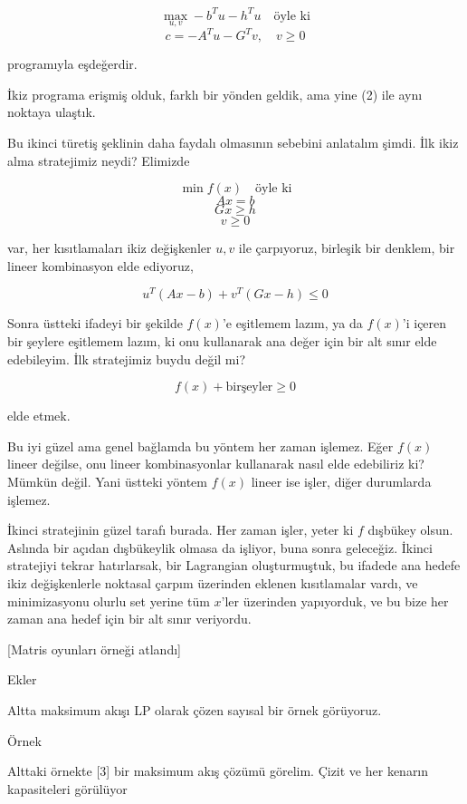\documentclass[12pt,fleqn]{article}\usepackage{../../common}
\begin{document}
$$
\max_{u,v} - b^T u - h^Tu   \quad \textrm{öyle ki}
$$
$$
c = -A^Tu - G^T v, \quad v \ge 0
$$

programıyla eşdeğerdir. 

İkiz programa erişmiş olduk, farklı bir yönden geldik, ama yine (2) ile
aynı noktaya ulaştık. 

Bu ikinci türetiş şeklinin daha faydalı olmasının sebebini anlatalım
şimdi. İlk ikiz alma stratejimiz neydi? Elimizde 

$$
\min f(x) \quad \textrm{öyle ki}
$$
$$
Ax = b
$$
$$
Gx \ge h
$$
$$
v \ge 0
$$

var, her kısıtlamaları ikiz değişkenler $u,v$ ile çarpıyoruz, birleşik bir
denklem, bir lineer kombinasyon elde ediyoruz,

$$
u^T(Ax-b) + v^T (Gx-h) \le 0
$$

Sonra üstteki ifadeyi bir şekilde $f(x)$'e eşitlemem lazım, ya da $f(x)$'i
içeren bir şeylere eşitlemem lazım, ki onu kullanarak ana değer için bir
alt sınır elde edebileyim. İlk stratejimiz buydu değil mi? 

$$
f(x) + \textrm{birşeyler} \ge 0
$$

elde etmek. 

Bu iyi güzel ama genel bağlamda bu yöntem her zaman işlemez. Eğer $f(x)$
lineer değilse, onu lineer kombinasyonlar kullanarak nasıl elde edebiliriz
ki? Mümkün değil. Yani üstteki yöntem $f(x)$ lineer ise işler, diğer
durumlarda işlemez.

İkinci stratejinin güzel tarafı burada. Her zaman işler, yeter ki $f$
dışbükey olsun. Aslında bir açıdan dışbükeylik olmasa da işliyor, buna
sonra geleceğiz. İkinci stratejiyi tekrar hatırlarsak, bir Lagrangian
oluşturmuştuk, bu ifadede ana hedefe ikiz değişkenlerle noktasal çarpım
üzerinden eklenen kısıtlamalar vardı, ve minimizasyonu olurlu set yerine
tüm $x$'ler üzerinden yapıyorduk, ve bu bize her zaman ana hedef için bir
alt sınır veriyordu.

[Matris oyunları örneği atlandı]

Ekler

Altta maksimum akışı LP olarak çözen sayısal bir örnek görüyoruz.

Örnek

Alttaki örnekte [3] bir maksimum akış çözümü görelim. Çizit ve her kenarın
kapasiteleri görülüyor
\end{document}
